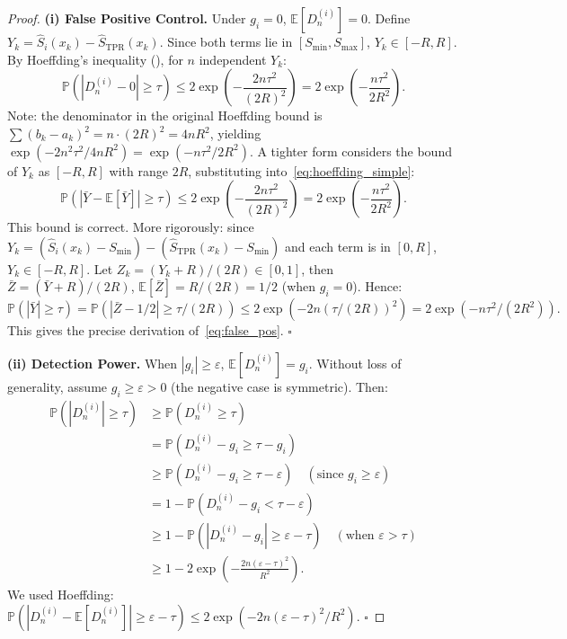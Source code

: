 \documentclass[11pt,a4paper]{article}
\theoremstyle{definition}
\newcommand{\E}{\mathbb{E}}
\newcommand{\Prob}{\mathbb{P}}
\begin{document}
\begin{proof}
\textbf{(i) False Positive Control.}
Under $g_i = 0$, $\E[D_n^{(i)}] = 0$. Define $Y_k = \hat{S}_i(x_k) - \hat{S}_{\text{TPR}}(x_k)$. Since both terms lie in $[S_{\min}, S_{\max}]$, $Y_k \in [-R, R]$. By Hoeffding's inequality (), for $n$ independent $Y_k$:
\begin{equation*}
    \Prob\left(|D_n^{(i)} - 0| \geq \tau\right) \leq 2\exp\left(-\frac{2n\tau^2}{(2R)^2}\right) = 2\exp\left(-\frac{n\tau^2}{2R^2}\right).
\end{equation*}
Note: the denominator in the original Hoeffding bound is $\sum (b_k - a_k)^2 = n \cdot (2R)^2 = 4nR^2$, yielding $\exp(-2n^2\tau^2 / 4nR^2) = \exp(-n\tau^2 / 2R^2)$. A tighter form considers the bound of $Y_k$ as $[-R, R]$ with range $2R$, substituting into~\eqref{eq:hoeffding_simple}:
\begin{equation*}
    \Prob\left(|\bar{Y} - \E[\bar{Y}]| \geq \tau\right) \leq 2\exp\left(-\frac{2n\tau^2}{(2R)^2}\right) = 2\exp\left(-\frac{n\tau^2}{2R^2}\right).
\end{equation*}
This bound is correct. More rigorously: since $Y_k = (\hat{S}_i(x_k) - S_{\min}) - (\hat{S}_{\text{TPR}}(x_k) - S_{\min})$ and each term is in $[0, R]$, $Y_k \in [-R, R]$. Let $Z_k = (Y_k + R)/(2R) \in [0,1]$, then $\bar{Z} = (\bar{Y} + R)/(2R)$, $\E[\bar{Z}] = R/(2R) = 1/2$ (when $g_i = 0$). Hence:
\begin{equation*}
    \Prob(|\bar{Y}| \geq \tau) = \Prob(|\bar{Z} - 1/2| \geq \tau/(2R)) \leq 2\exp(-2n(\tau/(2R))^2) = 2\exp(-n\tau^2/(2R^2)).
\end{equation*}
This gives the precise derivation of~\eqref{eq:false_pos}. $\square$

\textbf{(ii) Detection Power.}
When $|g_i| \geq \varepsilon$, $\E[D_n^{(i)}] = g_i$. Without loss of generality, assume $g_i \geq \varepsilon > 0$ (the negative case is symmetric). Then:
\begin{align*}
    \Prob\left(|D_n^{(i)}| \geq \tau\right) &\geq \Prob\left(D_n^{(i)} \geq \tau\right) \\
    &= \Prob\left(D_n^{(i)} - g_i \geq \tau - g_i\right) \\
    &\geq \Prob\left(D_n^{(i)} - g_i \geq \tau - \varepsilon\right) \quad (\text{since } g_i \geq \varepsilon) \\
    &= 1 - \Prob\left(D_n^{(i)} - g_i < \tau - \varepsilon\right) \\
    &\geq 1 - \Prob\left(|D_n^{(i)} - g_i| \geq \varepsilon - \tau\right) \quad (\text{when } \varepsilon > \tau) \\
    &\geq 1 - 2\exp\left(-\frac{2n(\varepsilon - \tau)^2}{R^2}\right).
\end{align*}
We used Hoeffding: $\Prob(|D_n^{(i)} - \E[D_n^{(i)}]| \geq \varepsilon - \tau) \leq 2\exp(-2n(\varepsilon-\tau)^2 / R^2)$. $\square$


\end{proof}
\end{document}
